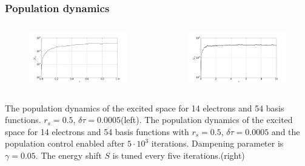 \documentclass{beamer}
\begin{document}
\begin{frame}
\frametitle{Population dynamics}

\begin{columns}
\begin{column}{0.48\textwidth}
\begin{center}
	\begin{figure}
		\includegraphics[scale=0.20]{Nex2000new}
	\end{figure}
\end{center}
\end{column}
\begin{column}{0.48\textwidth}
\begin{center}
	\begin{figure}
		\includegraphics[scale=0.20]{Nex20000}
	\end{figure}
\end{center}
\end{column}
\end{columns}
\tiny The population dynamics of the excited space for 14 electrons and 54 basis functions. $r_s=0.5$, $\delta \tau=0.0005$(left).
The population dynamics of the excited space for 14 electrons and 54 basis functions with $r_s=0.5$, $\delta \tau=0.0005$ and the population control enabled after $5\cdot 10^3$ iterations. Dampening parameter is $\gamma = 0.05$. The energy shift $S$ is tuned every five iterations.(right) 	
\end{frame}
\end{document}
